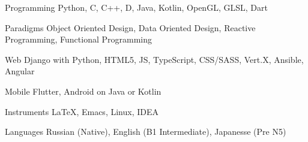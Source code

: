 


\begin{cvskills}


\cvskill
{Programming} %
{Python, C, C++, D, Java, Kotlin, OpenGL, GLSL, Dart} %

\cvskill
{Paradigms} %
{Object Oriented Design, Data Oriented Design, Reactive Programming, Functional Programming}



\cvskill
{Web} %
{Django with Python, HTML5, JS, TypeScript, CSS/SASS, Vert.X, Ansible, Angular} %

\cvskill
{Mobile} %
{Flutter, Android on Java or Kotlin} %

\cvskill
{Instruments}
{LaTeX, Emacs, Linux, IDEA}


\cvskill
{Languages} %
{Russian (Native), English (B1 Intermediate), Japanesse (Pre N5)} %


\end{cvskills}
